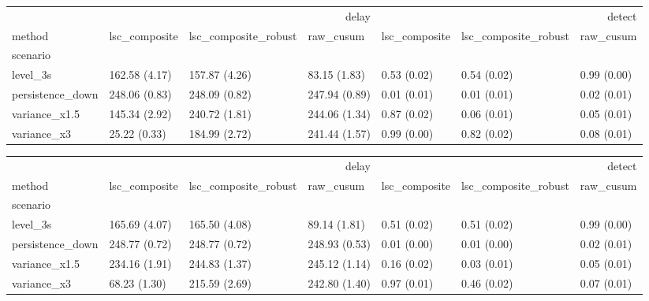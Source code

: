 \begin{tabular}{lllllll}
\toprule
 & \multicolumn{3}{r}{delay} & \multicolumn{3}{r}{detect} \\
method & lsc_composite & lsc_composite_robust & raw_cusum & lsc_composite & lsc_composite_robust & raw_cusum \\
scenario &  &  &  &  &  &  \\
\midrule
level_3s & 162.58 (4.17) & 157.87 (4.26) & 83.15 (1.83) & 0.53 (0.02) & 0.54 (0.02) & 0.99 (0.00) \\
persistence_down & 248.06 (0.83) & 248.09 (0.82) & 247.94 (0.89) & 0.01 (0.01) & 0.01 (0.01) & 0.02 (0.01) \\
variance_x1.5 & 145.34 (2.92) & 240.72 (1.81) & 244.06 (1.34) & 0.87 (0.02) & 0.06 (0.01) & 0.05 (0.01) \\
variance_x3 & 25.22 (0.33) & 184.99 (2.72) & 241.44 (1.57) & 0.99 (0.00) & 0.82 (0.02) & 0.08 (0.01) \\
\bottomrule
\end{tabular}

\begin{tabular}{lllllll}
\toprule
 & \multicolumn{3}{r}{delay} & \multicolumn{3}{r}{detect} \\
method & lsc_composite & lsc_composite_robust & raw_cusum & lsc_composite & lsc_composite_robust & raw_cusum \\
scenario &  &  &  &  &  &  \\
\midrule
level_3s & 165.69 (4.07) & 165.50 (4.08) & 89.14 (1.81) & 0.51 (0.02) & 0.51 (0.02) & 0.99 (0.00) \\
persistence_down & 248.77 (0.72) & 248.77 (0.72) & 248.93 (0.53) & 0.01 (0.00) & 0.01 (0.00) & 0.02 (0.01) \\
variance_x1.5 & 234.16 (1.91) & 244.83 (1.37) & 245.12 (1.14) & 0.16 (0.02) & 0.03 (0.01) & 0.05 (0.01) \\
variance_x3 & 68.23 (1.30) & 215.59 (2.69) & 242.80 (1.40) & 0.97 (0.01) & 0.46 (0.02) & 0.07 (0.01) \\
\bottomrule
\end{tabular}
